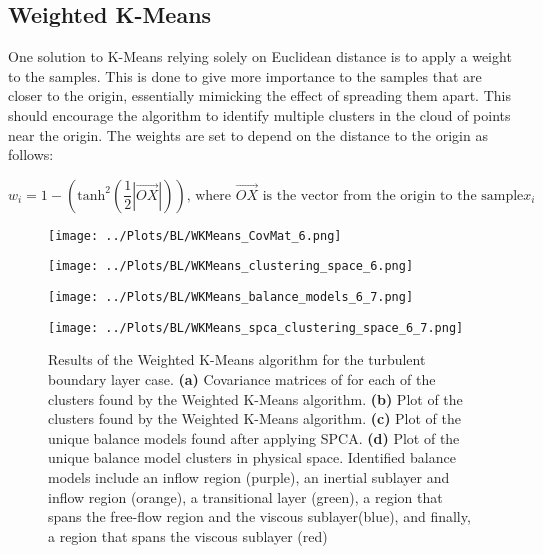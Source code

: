 \documentclass[12pt]{report} %
\begin{document}
\subsection{Weighted K-Means}

One solution to K-Means relying solely on Euclidean distance is to apply a weight to the samples. This is done to give more importance to the samples that are closer to the origin, essentially mimicking the effect of spreading them apart. This should encourage the algorithm to identify multiple clusters in the cloud of points near the origin. The weights are set to depend on the distance to the origin as follows:

\begin{equation}
  w_i = 1 - (\text{tanh}^{2}(\frac{1}{2}|\vec{OX}|)) \text{, where } \vec{OX} \text{ is the vector from the origin to the sample} x_i
\end{equation}

\begin{figure}[htbp]
  \centering

  \begin{minipage}{0.7\textwidth}
    \centering
    \texttt{[image: ../Plots/BL/WKMeans\_CovMat\_6.png]}
    \subcaption{}
  \end{minipage}

  \begin{minipage}{\textwidth}
      \begin{minipage}[b]{0.6\textwidth}
          \centering
          \texttt{[image: ../Plots/BL/WKMeans\_clustering\_space\_6.png]}
          \subcaption{}
      \end{minipage}
      \begin{minipage}[b]{0.35\textwidth}
          \centering
          \texttt{[image: ../Plots/BL/WKMeans\_balance\_models\_6\_7.png]}
          \subcaption{}
      \end{minipage}
  \end{minipage}

  \begin{minipage}{0.7\textwidth}
      \centering
      \texttt{[image: ../Plots/BL/WKMeans\_spca\_clustering\_space\_6\_7.png]}
      \subcaption{}
  \end{minipage}
  \caption{Results of the Weighted K-Means algorithm for the turbulent boundary layer case. \textbf{(a)} Covariance matrices of for each of the clusters found by the Weighted K-Means algorithm. \textbf{(b)} Plot of the clusters found by the Weighted K-Means algorithm. \textbf{(c)} Plot of the unique balance models found after applying SPCA. \textbf{(d)} Plot of the unique balance model clusters in physical space. Identified balance models include an inflow region (purple), an inertial sublayer and inflow region (orange), a transitional layer (green), a region that spans the free-flow region and the viscous sublayer(blue), and finally, a region that spans the viscous sublayer (red)}
  \label{fig:WKMeans_results}
\end{figure}
\end{document}
